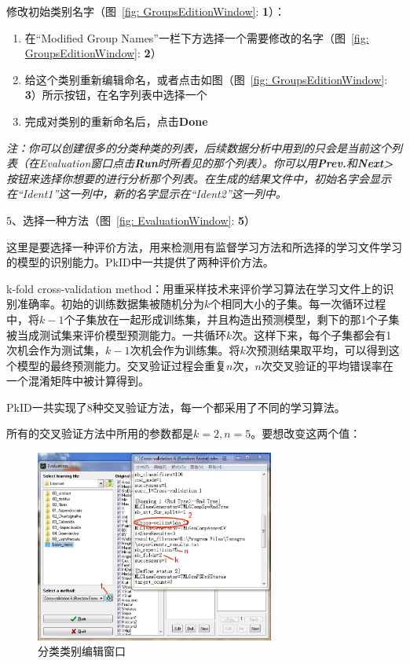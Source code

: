 \documentclass[12pt]{article}
\begin{document}
修改初始类别名字（图~\ref{fig: GroupsEditionWindow}: {\color{red}\textbf{1}}）：
\begin{enumerate}
\item 在“Modified Group Names”一栏下方选择一个需要修改的名字（图~\ref{fig: GroupsEditionWindow}: {\color{red}\textbf{2}}）
\item 给这个类别重新编辑命名，或者点击如图（图~\ref{fig: GroupsEditionWindow}: {\color{red}\textbf{3}}）所示按钮，在名字列表中选择一个
\item 完成对类别的重新命名后，点击\textbf{Done}
\end{enumerate}
{\color{blue}\textit{注：你可以创建很多的分类种类的列表，后续数据分析中用到的只会是当前这个列表（在Evaluation窗口点击\textbf{Run}时所看见的那个列表）。你可以用\textbf{Prev.}和\textbf{Next>}按钮来选择你想要的进行分析那个列表。在生成的结果文件中，初始名字会显示在“Ident1”这一列中，新的名字显示在“Ident2”这一列中。}}

5、选择一种方法（图~\ref{fig: EvaluationWindow}: {\color{red}\textbf{5}}）

这里是要选择一种评价方法，用来检测用有监督学习方法和所选择的学习文件学习的模型的识别能力。PkID中一共提供了两种评价方法。

{\color{red}k-fold cross-validation method}：用重采样技术来评价学习算法在学习文件上的识别准确率。初始的训练数据集被随机分为$k$个相同大小的子集。每一次循环过程中，将$k-1$个子集放在一起形成训练集，并且构造出预测模型，剩下的那1个子集被当成测试集来评价模型预测能力。一共循环$k$次。这样下来，每个子集都会有1次机会作为测试集，$k-1$次机会作为训练集。将$k$次预测结果取平均，可以得到这个模型的最终预测能力。交叉验证过程会重复$n$次，$n$次交叉验证的平均错误率在一个混淆矩阵中被计算得到。

PkID一共实现了8种交叉验证方法，每一个都采用了不同的学习算法。

所有的交叉验证方法中所用的参数都是$k = 2, n = 5$。要想改变这两个值：

\begin{figure}[!ht]
\centering
\includegraphics[width=0.7\textwidth]{ModificationofCrossValidationParameterisation.eps}
\caption{分类类别编辑窗口}
\label{fig: ModificationofCrossValidationParameterisation}
\end{figure}
\end{document}
